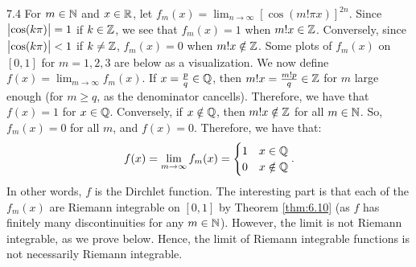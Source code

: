 \begin{example}{}{7.4}
    For $m \in \mathbb{N}$ and $x \in \mathbb{R}$, let $f_m(x) = \lim_{n \rightarrow \infty} \left[\cos(m!\pi x)\right]^{2n}$. Since $\abs{\cos(k\pi)} = 1$ if $k \in \mathbb{Z}$, we see that $f_m(x) = 1$ when $m! x \in \mathbb{Z}$. Conversely, since $\abs{\cos(k\pi)} < 1$ if $k \neq \mathbb{Z}$, $f_m(x) = 0$ when $m! x \notin \mathbb{Z}$. Some plots of $f_m(x)$ on $[0, 1]$ for $m = 1, 2, 3$ are below as a visualization. We now define $f(x) = \lim_{m \rightarrow \infty} f_m(x)$. If $x = \frac{p}{q} \in \mathbb{Q}$, then $m! x = \frac{m! p}{q} \in \mathbb{Z}$ for $m$ large enough (for $m \geq q$, as the denominator cancells). Therefore, we have that $f(x) = 1$ for $x \in \mathbb{Q}$. Conversely, if $x \notin \mathbb{Q}$, then $m! x \notin \mathbb{Z}$ for all $m \in \mathbb{N}$. So, $f_m(x) = 0$ for all $m$, and $f(x) = 0$. Therefore, we have that:
    \begin{align*}
        f(x) = \lim_{m \rightarrow \infty} f_m(x) = \begin{cases}
            1 & x \in \mathbb{Q}
            \\ 0 & x \notin \mathbb{Q}
        \end{cases}.
    \end{align*}
    In other words, $f$ is the Dirchlet function. The interesting part is that each of the $f_m(x)$ are Riemann integrable on $[0, 1]$ by Theorem \ref{thm:6.10} (as $f$ has finitely many discontinuities for any $m \in \mathbb{N}$). However, the limit is not Riemann integrable, as we prove below. Hence, the limit of Riemann integrable functions is not necessarily Riemann integrable.
\end{example}


